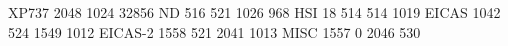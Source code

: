 XP737 2048 1024 32856
ND        516 521 1026  968
HSI        18 514  514 1019
EICAS    1042 524 1549 1012
EICAS-2  1558 521 2041 1013
MISC     1557   0 2046  530
